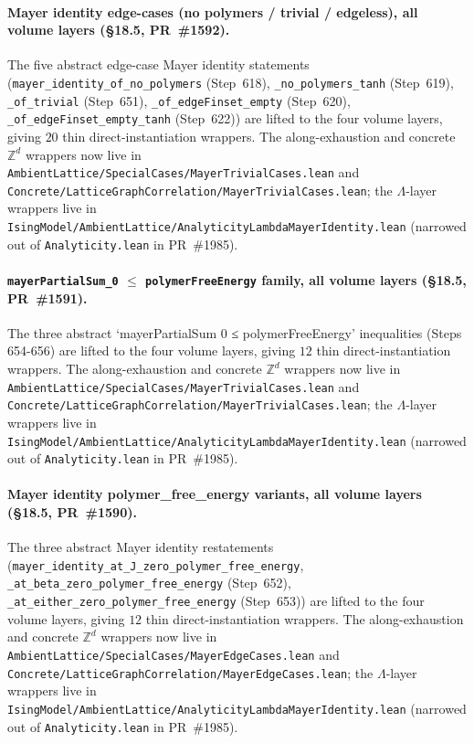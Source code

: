 \documentclass[a4paper,11pt]{article}
\begin{document}
\paragraph{Mayer identity edge-cases (no polymers / trivial /
edgeless), all volume layers (\S18.5, PR~\#1592).} The five abstract
edge-case Mayer identity statements
(\texttt{mayer\_identity\_of\_no\_polymers} (Step~618),
\texttt{\_no\_polymers\_tanh} (Step~619),
\texttt{\_of\_trivial} (Step~651),
\texttt{\_of\_edgeFinset\_empty} (Step~620),
\texttt{\_of\_edgeFinset\_empty\_tanh} (Step~622)) are lifted to
the four volume layers, giving $20$ thin direct-instantiation
wrappers. The along-exhaustion and concrete $\mathbb{Z}^d$
wrappers now live in
\texttt{AmbientLattice/SpecialCases/MayerTrivialCases.lean}
and
\texttt{Concrete/LatticeGraphCorrelation/MayerTrivialCases.lean};
the $\Lambda$-layer wrappers live in
\texttt{IsingModel/AmbientLattice/AnalyticityLambdaMayerIdentity.lean}
(narrowed out of \texttt{Analyticity.lean} in PR~\#1985).

\paragraph{\texttt{mayerPartialSum\_0} $\le$
\texttt{polymerFreeEnergy} family, all volume layers (\S18.5,
PR~\#1591).} The three abstract `mayerPartialSum 0 ≤
polymerFreeEnergy' inequalities (Steps 654-656) are lifted to the
four volume layers, giving $12$ thin direct-instantiation wrappers.
The along-exhaustion and concrete $\mathbb{Z}^d$ wrappers now live in
\texttt{AmbientLattice/SpecialCases/MayerTrivialCases.lean}
and
\texttt{Concrete/LatticeGraphCorrelation/MayerTrivialCases.lean};
the $\Lambda$-layer wrappers live in
\texttt{IsingModel/AmbientLattice/AnalyticityLambdaMayerIdentity.lean}
(narrowed out of \texttt{Analyticity.lean} in PR~\#1985).

\paragraph{Mayer identity polymer\_free\_energy variants, all
volume layers (\S18.5, PR~\#1590).} The three abstract Mayer
identity restatements
(\texttt{mayer\_identity\_at\_J\_zero\_polymer\_free\_energy},
\texttt{\_at\_beta\_zero\_polymer\_free\_energy} (Step~652),
\texttt{\_at\_either\_zero\_polymer\_free\_energy} (Step~653))
are lifted to the four volume layers, giving $12$ thin
direct-instantiation wrappers. The along-exhaustion and concrete
$\mathbb{Z}^d$ wrappers now live in
\texttt{AmbientLattice/SpecialCases/MayerEdgeCases.lean}
and
\texttt{Concrete/LatticeGraphCorrelation/MayerEdgeCases.lean};
the $\Lambda$-layer wrappers live in
\texttt{IsingModel/AmbientLattice/AnalyticityLambdaMayerIdentity.lean}
(narrowed out of \texttt{Analyticity.lean} in PR~\#1985).
\end{document}
